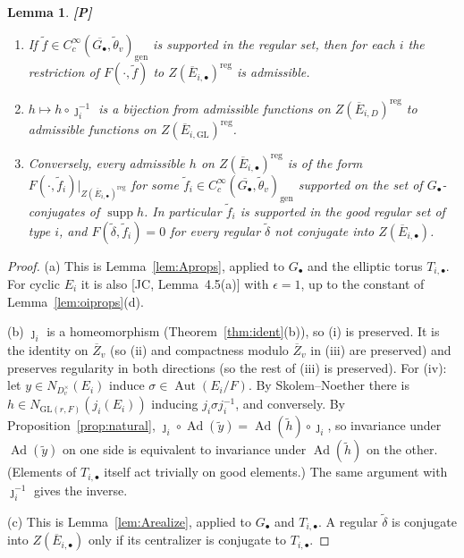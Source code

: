 \documentclass[12pt]{article}
\newcommand{\ov}[1]{\overline{#1}}
\newcommand{\eps}{\epsilon}
\newcommand{\gen}{\mathrm{gen}}
\newcommand{\reg}{\mathrm{reg}}
\newcommand{\Aut}{\operatorname{Aut}}
\newcommand{\Ad}{\operatorname{Ad}}
\newcommand{\supp}{\operatorname{supp}}
\newcommand{\GL}{\mathrm{GL}}
\newcommand{\Zb}{\ov{Z}}
\newcommand{\Eb}{\ov{E}}
\newcommand{\jj}{\jmath}
\newcommand{\Pv}{\textbf{[P]}}
\theoremstyle{plain}
\newtheorem{lemma}[theorem]{Lemma}
\theoremstyle{definition}
\begin{document}
\begin{lemma}\label{lem:transported}\Pv
\begin{enumerate}[label=(\alph*)]
\item If $\tilde f\in C_c^\infty(\ov{G_\bullet},\tilde\theta_v)_\gen$ is supported in the regular set, then for each $i$ the restriction of $F(\cdot,\tilde f)$ to $Z(\Eb_{i,\bullet})^{\reg}$ is admissible.
\item $h\mapsto h\circ\jj_i^{-1}$ is a bijection from admissible functions on $Z(\Eb_{i,D})^{\reg}$ to admissible functions on $Z(\Eb_{i,\GL})^{\reg}$.
\item Conversely, every admissible $h$ on $Z(\Eb_{i,\bullet})^{\reg}$ is of the form $F(\cdot,\tilde f_i)|_{Z(\Eb_{i,\bullet})^{\reg}}$ for some $\tilde f_i\in C_c^\infty(\ov{G_\bullet},\tilde\theta_v)_\gen$ supported on the set of $G_\bullet$-conjugates of $\supp h$. In particular $\tilde f_i$ is supported in the good regular set of type $i$, and $F(\tilde\delta,\tilde f_i)=0$ for every regular $\tilde\delta$ not conjugate into $Z(\Eb_{i,\bullet})$.
\end{enumerate}
\end{lemma}

\begin{proof}
(a) This is Lemma~\ref{lem:Aprops}, applied to $G_\bullet$ and the elliptic torus $T_{i,\bullet}$. For cyclic $E_i$ it is also [JC, Lemma~4.5(a)] with $\eps=1$, up to the constant of Lemma~\ref{lem:oiprops}(d).

(b) $\jj_i$ is a homeomorphism (Theorem~\ref{thm:ident}(b)), so (i) is preserved. It is the identity on $\Zb_v$ (so (ii) and compactness modulo $\Zb_v$ in (iii) are preserved) and preserves regularity in both directions (so the rest of (iii) is preserved). For (iv): let $y\in N_{D_v^\times}(E_i)$ induce $\sigma\in\Aut(E_i/F)$. By Skolem--Noether there is $h\in N_{\GL(r,F)}(j_i(E_i))$ inducing $j_i\sigma j_i^{-1}$, and conversely. By Proposition~\ref{prop:natural}, $\jj_i\circ\Ad(\tilde y)=\Ad(\tilde h)\circ\jj_i$, so invariance under $\Ad(\tilde y)$ on one side is equivalent to invariance under $\Ad(\tilde h)$ on the other. (Elements of $T_{i,\bullet}$ itself act trivially on good elements.) The same argument with $\jj_i^{-1}$ gives the inverse.

(c) This is Lemma~\ref{lem:Arealize}, applied to $G_\bullet$ and $T_{i,\bullet}$. A regular $\tilde\delta$ is conjugate into $Z(\Eb_{i,\bullet})$ only if its centralizer is conjugate to $T_{i,\bullet}$.
\end{proof}
\end{document}
